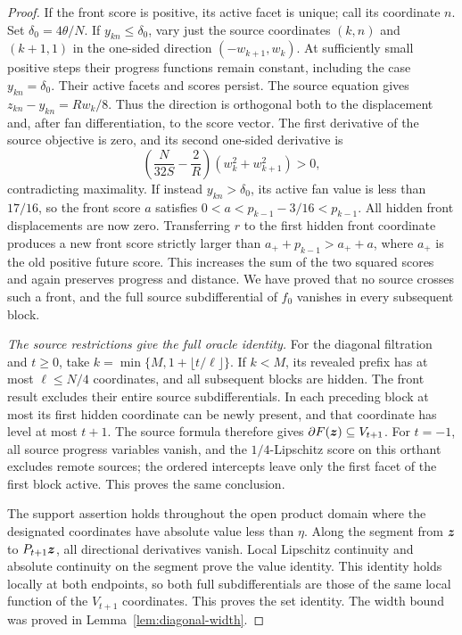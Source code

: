 {\begin{proof}
If the front score is positive, its active facet is unique; call its
coordinate $n$.  Set $\delta_0=4\theta/N$.  If $y_{kn}\le\delta_0$,
vary just the source coordinates $(k,n)$ and $(k+1,1)$ in the
one-sided direction $(-w_{k+1},w_k)$.  At sufficiently small positive
steps their progress functions remain constant, including the case
$y_{kn}=\delta_0$.  Their active facets and scores persist.
The source equation gives $z_{kn}-y_{kn}=Rw_k/8$.  Thus the direction
is orthogonal both to the displacement and, after fan differentiation,
to the score vector.  The first derivative of the source objective
is zero, and its second one-sided derivative is
\[
 \left(\frac{N}{32S}-\frac2R\right)(w_k^2+w_{k+1}^2)>0,
\]
contradicting maximality.  If instead $y_{kn}>\delta_0$, its active
fan value is less than $17/16$, so the front score $a$ satisfies
$0<a<p_{k-1}-3/16<p_{k-1}$.  All hidden front displacements are now
zero.  Transferring $r$ to the first hidden front coordinate produces
a new front score strictly larger than $a_++p_{k-1}>a_++a$, where
$a_+$ is the old positive future score.  This increases the sum of
the two squared scores and again preserves progress and distance.
We have proved that no source crosses such a front, and the full
source subdifferential of $f_0$ vanishes in every subsequent block.

\emph{The source restrictions give the full oracle identity.}
For the diagonal filtration and $t\ge0$, take
$k=\min\{M,1+\lfloor t/\ell\rfloor\}$.  If $k<M$, its revealed
prefix has at most $\ell\le N/4$ coordinates, and all subsequent
blocks are hidden.  The front result excludes their entire source
subdifferentials.  In each preceding block at most its first hidden
coordinate can be newly present, and that coordinate has level at
most $t+1$.  The source formula therefore gives
$\partial F(\bm{z})\subseteq V_{t+1}$.
For $t=-1$, all source progress variables vanish, and the
$1/4$-Lipschitz score on this orthant excludes remote sources;
the ordered intercepts leave only the first facet of the first
block active.  This proves the same conclusion.

The support assertion holds throughout the open product domain
where the designated coordinates have absolute value less than
$\eta$.  Along the segment from $\bm{z}$ to $P_{t+1}\bm{z}$, all
directional derivatives vanish.  Local Lipschitz continuity and
absolute continuity on the segment prove the value identity.
This identity holds locally at both endpoints, so both full
subdifferentials are those of the same local function of the
$V_{t+1}$ coordinates.  This proves the set identity.
The width bound was proved in Lemma~\ref{lem:diagonal-width}.
\end{proof}}

